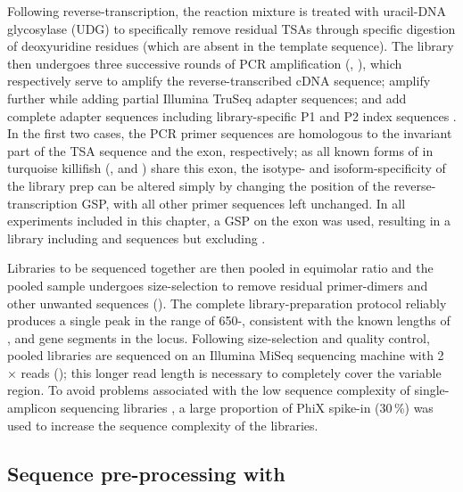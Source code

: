 Following reverse-transcription, the reaction mixture is treated with uracil-DNA glycosylase (UDG) to specifically remove residual TSAs through specific digestion of deoxyuridine residues (which are absent in the template sequence). The library then undergoes three successive rounds of PCR amplification (, ), which respectively serve to amplify the reverse-transcribed cDNA sequence; amplify further while adding partial Illumina TruSeq adapter sequences; and add complete adapter sequences including library-specific P1 and P2 index sequences \parencite{vollmers2013consensus}. In the first two cases, the PCR primer sequences are homologous to the invariant part of the TSA sequence and the  exon, respectively; as all known forms of \igh{} in turquoise killifish (,  and ) share this exon, the isotype- and isoform-specificity of the library prep can be altered simply by changing the position of the reverse-transcription GSP, with all other primer sequences left unchanged. In all experiments included in this chapter, a GSP on the  exon was used, resulting in a library including  and  sequences but excluding .

Libraries to be sequenced together are then pooled in equimolar ratio and the pooled sample undergoes size-selection to remove residual primer-dimers and other unwanted sequences (). The complete library-preparation protocol reliably produces a single peak in the range of 650-, consistent with the known lengths of \vh, \dh and \jh gene segments in the \Nfu locus. Following size-selection and quality control, pooled libraries are sequenced on an Illumina MiSeq sequencing machine with 2 ×  reads (); this longer read length is necessary to completely cover the variable region. To avoid problems associated with the low sequence complexity of single-amplicon sequencing libraries \parencite{illumina2017diversity}, a large proportion of PhiX spike-in (30\,\%) was used to increase the sequence complexity of the libraries.

\subsection{Sequence pre-processing with }
\label{sec:igseq_protocol_preprocess}

